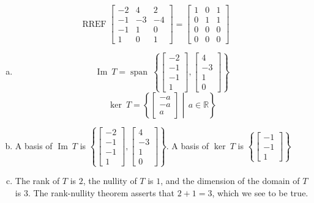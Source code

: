 \begin{exerciseAnswer} 


\[\operatorname{RREF} \left[\begin{array}{ccc}
-2 & 4 & 2 \\
-1 & -3 & -4 \\
-1 & 1 & 0 \\
1 & 0 & 1
\end{array}\right] = \left[\begin{array}{ccc}
1 & 0 & 1 \\
0 & 1 & 1 \\
0 & 0 & 0 \\
0 & 0 & 0
\end{array}\right] \]


\begin{enumerate}[(a)]
\item \[\operatorname{Im}\ T = \operatorname{span}\  \left\{ \left[\begin{array}{c}
-2 \\
-1 \\
-1 \\
1
\end{array}\right] , \left[\begin{array}{c}
4 \\
-3 \\
1 \\
0
\end{array}\right] \right\} \]\[\operatorname{ker}\ T =  \left\{ \left[\begin{array}{c}
-a \\
-a \\
a
\end{array}\right] \middle|\,a\in\mathbb{R}\right\} \]
\item  A basis of \(\operatorname{Im}\ T\) is \( \left\{ \left[\begin{array}{c}
-2 \\
-1 \\
-1 \\
1
\end{array}\right] , \left[\begin{array}{c}
4 \\
-3 \\
1 \\
0
\end{array}\right] \right\} \). A basis of \(\operatorname{ker}\ T\) is \( \left\{ \left[\begin{array}{c}
-1 \\
-1 \\
1
\end{array}\right] \right\} \)
\item  The rank of \(T\) is \( 2 \), the nullity of \(T\) is \( 1 \), and the dimension of the domain of \(T\) is \( 3 \). The rank-nullity theorem asserts that \( 2 + 1 = 3 \), which we see to be true. 
\end{enumerate}
    
\end{exerciseAnswer}
    
